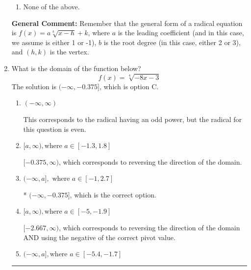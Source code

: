 \documentclass{extbook}[14pt]
\newcommand{\litem}[1]{\item #1

\rule{\textwidth}{0.4pt}}
\begin{document}
\begin{enumerate}
{\begin{enumerate}[label=\Alph*.]
\item None of the above.\end{enumerate}
\textbf{General Comment:} Remember that the general form of a radical equation is $ f(x) = a \sqrt[b]{x - h} + k $, where $a$ is the leading coefficient (and in this case, we assume is either 1 or -1), $b$ is the root degree (in this case, either 2 or 3), and $(h, k)$ is the vertex.
}
\litem{
What is the domain of the function below?
\[ f(x) = \sqrt[4]{-8 x - 3} \]
The solution is \( (-\infty, -0.375] \), which is option C.\begin{enumerate}[label=\Alph*.]
\item \( (-\infty, \infty) \)

This corresponds to the radical having an odd power, but the radical for this question is even.
\item \( [a, \infty), \text{where } a \in [-1.3, 1.8] \)

 $[-0.375, \infty)$, which corresponds to reversing the direction of the domain.
\item \( (-\infty, a], \text{ where } a \in [-1, 2.7] \)

* $(-\infty, -0.375]$, which is the correct option.
\item \( [a, \infty), \text{where } a \in [-5, -1.9] \)

$[-2.667, \infty)$, which corresponds to reversing the direction of the domain AND using the negative of the correct pivot value.
\item \( (-\infty, a], \text{where } a \in [-5.4, -1.7] \)


\end{enumerate}}
\end{enumerate}
\end{document}
